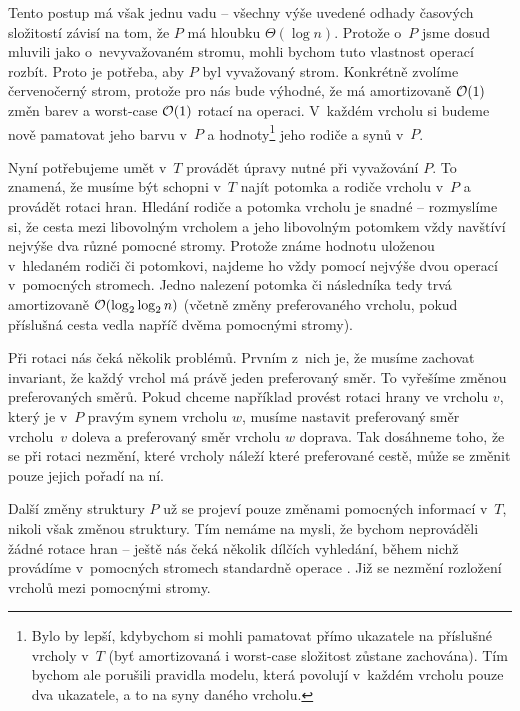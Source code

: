 Tento postup má však jednu vadu -- všechny výše uvedené odhady časových složitostí závisí na tom, že
$P$ má hloubku $\Theta(\log n)$. Protože o~$P$ jsme dosud mluvili jako
o~nevyvažovaném stromu, mohli bychom tuto vlastnost operací  rozbít.
Proto je potřeba, aby $P$ byl vyvažovaný strom. Konkrétně zvolíme červenočerný
strom, protože pro nás bude výhodné, že má amortizovaně $\mathcal O(1)$ změn barev a
worst-case $\mathcal O(1)$ rotací na operaci. V~každém vrcholu si budeme nově pamatovat
jeho barvu v~$P$ a hodnoty\footnote{Bylo by lepší, kdybychom si mohli pamatovat
přímo ukazatele na příslušné vrcholy v~$T$ (byť amortizovaná i worst-case složitost zůstane zachována). Tím bychom ale
porušili pravidla modelu, která povolují v~každém vrcholu pouze dva ukazatele,
a to na syny daného vrcholu.} jeho rodiče a synů v~$P$. 

Nyní potřebujeme umět v~$T$ provádět úpravy nutné při vyvažování $P$. To
znamená, že musíme být schopni v~$T$ najít potomka a rodiče vrcholu v~$P$ a provádět
rotaci hran. Hledání rodiče a potomka vrcholu je snadné -- rozmyslíme si, že
cesta mezi libovolným vrcholem a jeho libovolným potomkem vždy navštíví nejvýše
dva různé pomocné stromy. Protože známe hodnotu uloženou v~hledaném rodiči či
potomkovi, najdeme ho vždy pomocí nejvýše dvou operací  v~pomocných
stromech. Jedno nalezení potomka či následníka tedy trvá amortizovaně
$\o(\log\log n)$ (včetně změny preferovaného vrcholu, pokud příslušná cesta
vedla napříč dvěma pomocnými stromy).

Při rotaci nás čeká několik problémů. Prvním z~nich je, že musíme zachovat
invariant, že každý vrchol má právě jeden preferovaný směr. To vyřešíme změnou
preferovaných směrů. Pokud chceme například provést rotaci hrany ve vrcholu
$v$, který je v~$P$ pravým synem vrcholu $w$, musíme nastavit preferovaný směr
vrcholu~$v$ doleva a preferovaný směr vrcholu $w$ doprava. Tak dosáhneme toho,
že se při rotaci nezmění, které vrcholy náleží které preferované cestě,
může se změnit pouze jejich pořadí na ní.

Další změny struktury $P$ už se projeví pouze změnami pomocných informací
v~$T$, nikoli však změnou struktury. Tím nemáme na mysli, že bychom neprováděli
žádné rotace hran -- ještě nás čeká několik dílčích vyhledání, během nichž
provádíme v~pomocných stromech standardně operace . Již se nezmění
rozložení vrcholů mezi pomocnými stromy.

